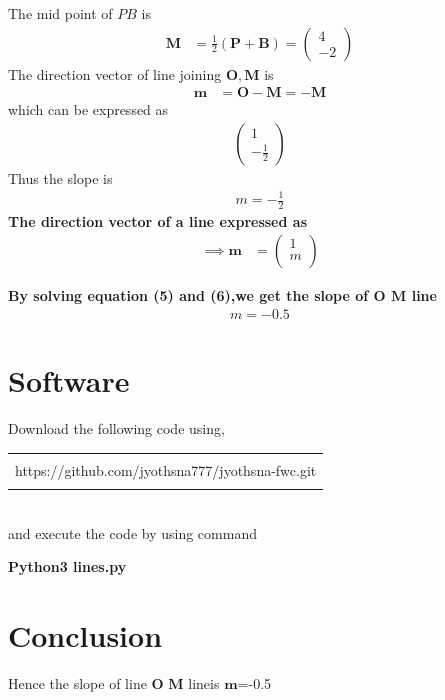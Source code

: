 \documentclass[journal,12pt,twocolumn]{IEEEtran}
\newcommand{\myvec}[1]{\ensuremath{\begin{pmatrix}#1\end{pmatrix}}}
\let\vec\mathbf
\begin{document}
 \fi 
The mid point of $PB$ is
\begin{align}
\vec{M} &=\frac{1}{2}(\vec{P}+\vec{B})
	= \myvec{4 \\ -2}  
\end{align}
The direction vector of line joining $\vec{O}, \vec{M}$ is 
\begin{align}
\vec{m}&=\vec{O}-\vec{M}
 = -\vec{M}
\end{align}
which can be expressed as
\begin{align}
	\myvec{1 \\ -\frac{1}{2}}
\end{align}
Thus the slope is
\begin{align}
	m = -\frac{1}{2}
\end{align}
\iffalse
\textbf{The direction vector of a line expressed as}
\begin{align}
\implies\vec{m} &= \begin{pmatrix}1 \\ m \\ \end{pmatrix}
\end{align}

\textbf{By solving equation (5) and (6),we get the slope of $\vec{O}$ $\vec{M}$ line}
\begin{align}
        \boxed{m=-0.5}
 \end{align}

\section{Software}
Download the following code using,
\begin{table}[h]
    \centering
    \begin{tabular}{|c|}
    \hline \\
   https://github.com/jyothsna777/jyothsna-fwc.git  \\
         \\
\hline
    \end{tabular}
\end{table}
\\
and execute the code by using command
\begin{center}
\textbf{Python3 lines.py}\\
\end{center}

\section{Conclusion}
Hence the slope of line $\vec{O}$ $\vec{M}$ lineis $\vec{m}$=-0.5
\end{document}
